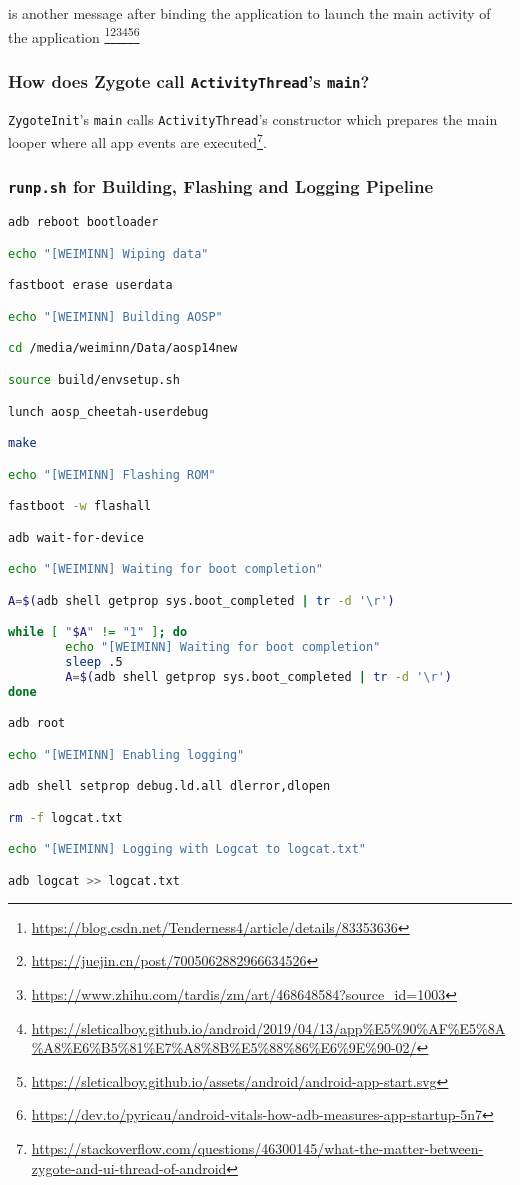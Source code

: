  is another message after binding the application to launch the main activity of the application \footnote{\url{https://blog.csdn.net/Tenderness4/article/details/83353636}}\footnote{\url{https://juejin.cn/post/7005062882966634526}}\footnote{\url{https://www.zhihu.com/tardis/zm/art/468648584?source_id=1003}}\footnote{\url{https://sleticalboy.github.io/android/2019/04/13/app\%E5\%90\%AF\%E5\%8A\%A8\%E6\%B5\%81\%E7\%A8\%8B\%E5\%88\%86\%E6\%9E\%90-02/}}\footnote{\url{https://sleticalboy.github.io/assets/android/android-app-start.svg}}\footnote{\url{https://dev.to/pyricau/android-vitals-how-adb-measures-app-startup-5n7}}

\subsubsection{How does Zygote call \texttt{ActivityThread}'s \texttt{main}?}

\texttt{ZygoteInit}'s \texttt{main} calls \texttt{ActivityThread}'s constructor which prepares the main looper where all app events are executed\footnote{\url{https://stackoverflow.com/questions/46300145/what-the-matter-between-zygote-and-ui-thread-of-android}}.

\subsubsection{\texttt{runp.sh} for Building, Flashing and Logging Pipeline}
\begin{lstlisting}[language=bash]
adb reboot bootloader

echo "[WEIMINN] Wiping data"

fastboot erase userdata

echo "[WEIMINN] Building AOSP"

cd /media/weiminn/Data/aosp14new

source build/envsetup.sh

lunch aosp_cheetah-userdebug

make

echo "[WEIMINN] Flashing ROM"

fastboot -w flashall

adb wait-for-device

echo "[WEIMINN] Waiting for boot completion"

A=$(adb shell getprop sys.boot_completed | tr -d '\r')

while [ "$A" != "1" ]; do
        echo "[WEIMINN] Waiting for boot completion"
        sleep .5
        A=$(adb shell getprop sys.boot_completed | tr -d '\r')
done

adb root

echo "[WEIMINN] Enabling logging"

adb shell setprop debug.ld.all dlerror,dlopen

rm -f logcat.txt 

echo "[WEIMINN] Logging with Logcat to logcat.txt"

adb logcat >> logcat.txt    
\end{lstlisting}

